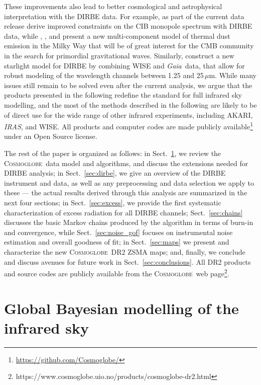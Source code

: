 \documentclass{aa}
\def\Cosmoglobe{\textsc{Cosmoglobe}}
\def\GAIA{\textit{Gaia}}
\def\AKARI{\textrm{{AKARI}}}
\def\IRAS{\textit{{IRAS}}}
\newcommand{\cosmoglobe}{\textsc{Cosmoglobe}}
\begin{document}
These improvements also lead to better cosmological and astrophysical interpretation with the DIRBE data. For example, as part of the current data release \citet{CG02_03} derive improved constraints on the CIB monopole spectrum with DIRBE data, while \citet{CG02_05}, \citet{CG02_06}, and \citet{CG02_07} present a new {multi}-component model of thermal dust emission in the Milky Way that will be of great interest for the CMB community in the search for primordial gravitational waves. Similarly, \citet{CG02_04} construct a new starlight model for DIRBE by combining WISE and \GAIA\ data, that allow for robust modeling of the wavelength channels between 1.25 and 25$\,\mu$m. While many issues still remain to be solved even after the current analysis, we argue that the products presented in the following redefine the standard for full infrared sky modelling, and the most of the methods described in the following are likely to be of direct use for the wide range of other infrared experiments, including \AKARI, \IRAS, and WISE. All products and computer codes are made publicly available\footnote{\url{https://github.com/Cosmoglobe/}} under an Open Source license.

The rest of the paper is organized as follows: in Sect.~\ref{sec:global_modelling}, we review the \cosmoglobe\ data model and algorithms, and discuss the extensions needed for DIRBE analysis; in Sect.~\ref{sec:dirbe}, we give an overview of the DIRBE instrument and data, as well as any preprocessing and data selection we apply to these ---
the actual results derived through this analysis are summarized in the next four sections; in Sect.~\ref{sec:excess}, we provide the first systematic characterization of excess radiation for all DIRBE channels; Sect.~\ref{sec:chains} discusses the basic Markov chains produced by the algorithm in terms of burn-in and convergence, while Sect.~\ref{sec:noise_gof} focuses on instrumental noise estimation and overall goodness of fit; in Sect.~\ref{sec:maps} we present and characterize the new \cosmoglobe\ DR2 ZSMA maps; and, finally, we conclude and discuss avenues for future work in Sect.~\ref{sec:conclusions}. All DR2 products and source codes are publicly available from the \Cosmoglobe\ web page\footnote{https://www.cosmoglobe.uio.no/products/cosmoglobe-dr2.html}.

\section{Global Bayesian modelling of the infrared sky}
\label{sec:global_modelling}
\end{document}
